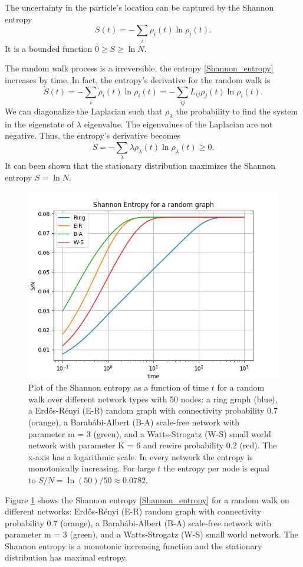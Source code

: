 The uncertainty in the particle's location can be captured by the Shannon entropy
\begin{equation}\label{Shannon_entropy}
    S(t) = -\sum_i \rho_i(t)\ln \rho_i(t).
\end{equation}
It is a bounded function $0\geq S \geq \ln N$.

The random walk process is a irreversible, the entropy \eqref{Shannon_entropy} increases by time. 
In fact, the entropy's derivative for the random walk is
\begin{equation}
        \dot S(t) = -\sum_i \dot\rho_i(t)\ln \rho_i(t) = -\sum_{ij} L_{ij} \rho_j(t)\ln \rho_i(t).
\end{equation}
We can diagonalize the Laplacian such that $\rho_\lambda$ the probability to find the system in the eigenstate of $\lambda$ eigenvalue.
The eigenvalues of the Laplacian are not negative. Thus, the entropy's derivative becomes
\begin{equation}
    \dot S = -\sum_\lambda \lambda \rho_\lambda(t) \ln \rho_\lambda(t) \geq 0.
\end{equation}
It can been shown that the stationary distribution maximizes the Shannon entropy $S = \ln N$.


\begin{figure}[ht!]
    \centering
    \includegraphics[width=0.70\linewidth]{image/Shannon_entropy.png}
    \caption{Plot of the Shannon entropy as a function of time $t$ for a random walk over different network types with 50 nodes: a ring graph (blue), a Erd\H{o}s-Rényi (E-R) random graph with connectivity probability 0.7 (orange), a Barab\'abi-Albert (B-A) scale-free network with parameter m = 3 (green), and a Watts-Strogatz (W-S) small world network with parameter K = 6 and rewire probability 0.2 (red). The x-axis has a logarithmic scale. In every network the entropy is monotonically increasing. For large $t$ the entropy per node is equal to $S/N = \ln(50)/50 \approx 0.0782$. }
    \label{Fig:Shannon_entropy}
\end{figure}
Figure \ref{Fig:Shannon_entropy} shows the Shannon entropy \eqref{Shannon_entropy} for a random walk on different networks: Erd\H{o}s-Rényi (E-R) random graph with connectivity probability 0.7 (orange), a Barab\'abi-Albert (B-A) scale-free network with parameter m = 3 (green), and a Watts-Strogatz (W-S) small world network. The Shannon entropy is a monotonic increasing function and the stationary distribution has maximal entropy.
   

